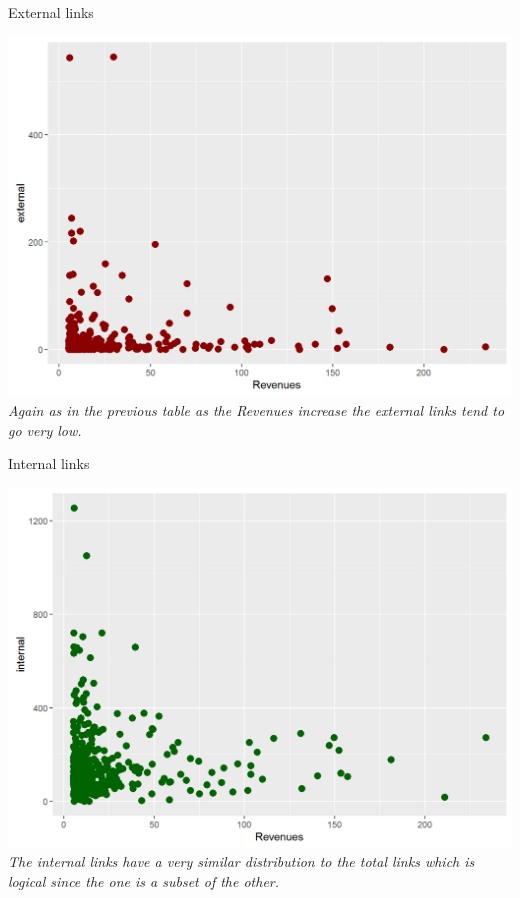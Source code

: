 \documentclass{book}
\begin{document}
\begin{table}[H]
\centering
\caption{External links}
\begin{center}
\includegraphics[scale=0.5]{../R/photos/26_ext_rev.png}  \\
\textit{Again as in the previous table as the Revenues increase the external links tend to go very low.}
\end{center}
\end{table}

\begin{table}[H]
\centering
\caption{Internal links}
\begin{center}
\includegraphics[scale=0.5]{../R/photos/28_int_rev.png}  \\
\textit{The internal links have a very similar distribution to the total links which is logical since the one is a subset of the other.}
\end{center}
\end{table}
\end{document}
